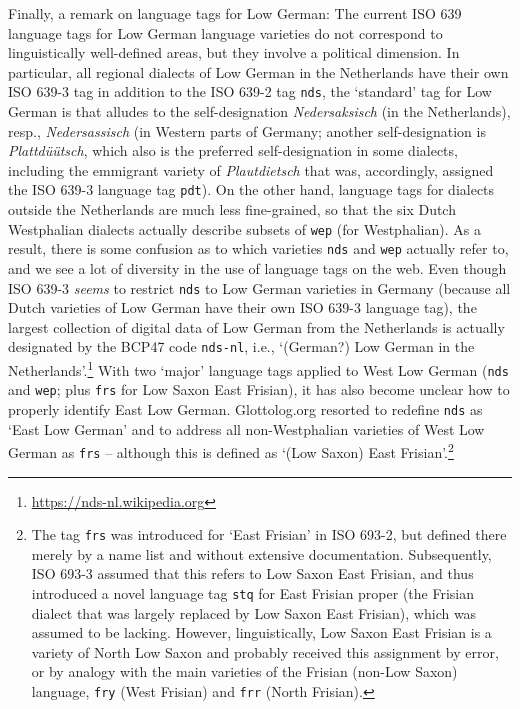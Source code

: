 \documentclass[11pt]{article}
\newcommand{\word}[1]{\textsl{#1}} %
\newcommand{\code}[1]{\texttt{#1}} %
\begin{document}
\begin{enumerate}
Finally, a remark on language tags for Low German: 
The current ISO 639 language tags for Low German language varieties do not correspond to linguistically well-defined areas, but they involve a political dimension.
In particular, all regional dialects of Low German in the Netherlands have their own ISO 639-3 tag in addition to the ISO 639-2 tag \code{nds}, the `standard' tag for Low German is that alludes to the self-designation \word{Nedersaksisch} (in the Netherlands), resp., \word{Nedersassisch} (in Western parts of Germany; another self-designation is \word{Plattdüütsch}, which also is the preferred self-designation in some dialects, including the emmigrant variety of \word{Plautdietsch} that was, accordingly, assigned the ISO 639-3 language tag \code{pdt}). On the other hand, language tags for dialects outside the Netherlands are much less fine-grained, so that the six Dutch Westphalian dialects actually describe subsets of \code{wep} (for Westphalian). As a result, there is some confusion as to which varieties \code{nds} and \code{wep} actually refer to, and we see a lot of diversity in the use of language tags on the web. Even though ISO 639-3 \emph{seems} to restrict \code{nds} to Low German varieties in Germany (because all Dutch varieties of Low German have their own ISO 639-3 language tag), the largest collection of digital data of Low German from the Netherlands is actually designated by the BCP47 code \code{nds-nl}, i.e., `(German?) Low German in the Netherlands'.\footnote{\url{https://nds-nl.wikipedia.org}} 
With two `major' language tags applied to West Low German (\code{nds} and \code{wep}; plus \code{frs} for Low Saxon East Frisian), it has also become unclear how to properly identify East Low German. Glottolog.org resorted to redefine \code{nds} as `East Low German' and to address all non-Westphalian varieties of West Low German as \code{frs} -- although this is defined as `(Low Saxon) East Frisian'.\footnote{
  The tag \code{frs} was introduced for `East Frisian' in ISO 693-2, but defined there merely by a name list and without extensive documentation. Subsequently, ISO 693-3 assumed that this refers to Low Saxon East Frisian, and thus introduced a novel language tag \code{stq} for East Frisian proper (the Frisian dialect that was largely replaced by Low Saxon East Frisian), which was assumed to be lacking. However, linguistically, Low Saxon East Frisian is a variety of North Low Saxon and probably received this assignment by error, or by analogy with the main varieties of the Frisian (non-Low Saxon) language, \code{fry} (West Frisian) and \code{frr} (North Frisian).
}
\end{enumerate}
\end{document}
